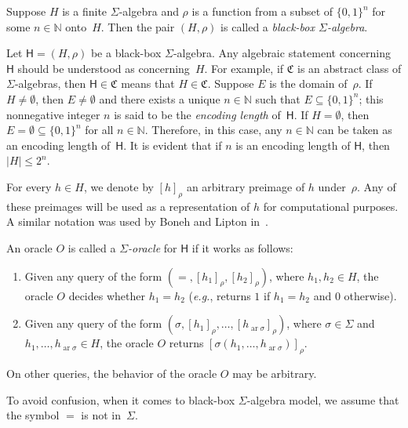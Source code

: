 \documentclass{jgcc}
\DeclareMathOperator{\ar}{ar}
\newcommand{\B}{\{0,1\}}
\newcommand{\cl}{\mathfrak}
\newcommand{\bb}{\mathsf}
\newcommand{\rep}[2]{[#1]_{#2}}
\newcommand{\acl}[1]{\lvert#1\rvert}
\newcommand{\N}{\mathbb N}
\newcommand{\eg}{\emph{e.g.}}
\begin{document}
\begin{defi}
Suppose $H$ is a finite $\Sigma$-algebra and $\rho$ is a
function from a subset of $\B^n$ for some $n\in\N$ onto~$H$.
Then the pair $(H,\rho)$ is called a \emph{black-box
$\Sigma$-algebra}.
\end{defi}

Let $\bb H=(H,\rho)$ be a black-box $\Sigma$-algebra. Any
algebraic statement concerning $\bb H$ should be understood
as concerning~$H$. For example, if $\cl C$ is an abstract
class of $\Sigma$-algebras, then $\bb H\in\cl C$ means that
$H\in\cl C$. Suppose $E$ is the domain of~$\rho$. If
$H\ne\emptyset$, then $E\ne\emptyset$ and there exists a
unique $n\in\N$ such that $E\subseteq\B^n$; this nonnegative
integer $n$ is said to be the \emph{encoding length} of~$\bb
H$. If $H=\emptyset$, then $E=\emptyset\subseteq\B^n$ for
all $n\in\N$. Therefore, in this case, any $n\in\N$ can be
taken as an encoding length of~$\bb H$. It is evident that
if $n$ is an encoding length of $\bb H$, then $\acl
H\le2^n$.

For every $h\in H$, we denote by $\rep h\rho$ an arbitrary
preimage of $h$ under~$\rho$. Any of these preimages will be
used as a representation of $h$ for computational purposes.
A similar notation was used by Boneh and Lipton
in~\cite{BL96}.

\begin{defi}
\label{d:Sigmaoracle}
An oracle $O$ is called a \emph{$\Sigma$-oracle} for $\bb H$
if it works as follows:
\begin{enumerate}[label=(\roman*)]
\item\label{i:Sigmaoracle:equality} Given any query of the
form $(=,\rep{h_1}\rho,\rep{h_2}\rho)$, where $h_1,h_2\in
H$, the oracle $O$ decides whether $h_1=h_2$ (\eg, returns
$1$ if $h_1=h_2$ and $0$ otherwise).

\item\label{i:Sigmaoracle:operations} Given any query of the
form $(\sigma,\rep{h_1}\rho,\dots,\rep{h_{\ar\sigma}}\rho)$,
where $\sigma\in\Sigma$ and $h_1,\dots,h_{\ar\sigma}\in H$,
the oracle $O$ returns
$\rep{\sigma(h_1,\dots,h_{\ar\sigma})}\rho$.
\end{enumerate}
On other queries, the behavior of the oracle $O$ may be
arbitrary.
\end{defi}

To avoid confusion, when it comes to black-box
$\Sigma$-algebra model, we assume that the symbol $=$ is not
in~$\Sigma$.
\end{document}
